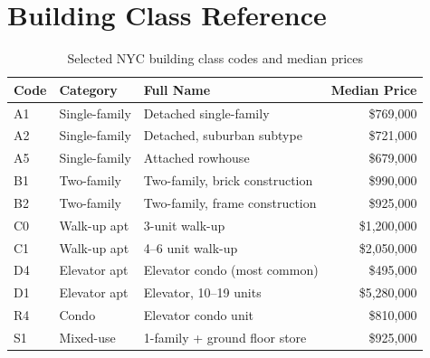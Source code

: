 \documentclass[11pt, a4paper, twoside]{article}
\begin{document}
\section{Building Class Reference}
\label{app:bldgclass}
\begin{table}[H]
  \centering
  \caption{Selected NYC building class codes and median prices}
  \label{tab:bldg_ref}
  \begin{tabular}{lllr}
    \toprule
    Code & Category & Full Name & Median Price \\
    \midrule
    A1 & Single-family & Detached single-family            & \$769,000 \\
    A2 & Single-family & Detached, suburban subtype        & \$721,000 \\
    A5 & Single-family & Attached rowhouse                 & \$679,000 \\
    B1 & Two-family    & Two-family, brick construction    & \$990,000 \\
    B2 & Two-family    & Two-family, frame construction    & \$925,000 \\
    C0 & Walk-up apt   & 3-unit walk-up                    & \$1,200,000 \\
    C1 & Walk-up apt   & 4--6 unit walk-up                 & \$2,050,000 \\
    D4 & Elevator apt  & Elevator condo (most common)      & \$495,000 \\
    D1 & Elevator apt  & Elevator, 10--19 units            & \$5,280,000 \\
    R4 & Condo         & Elevator condo unit               & \$810,000 \\
    S1 & Mixed-use     & 1-family + ground floor store     & \$925,000 \\
    \bottomrule
  \end{tabular}
\end{table}
\end{document}
